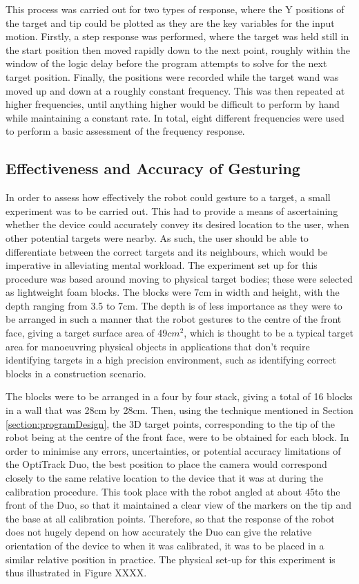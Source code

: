 \documentclass[11pt]{article}
\begin{document}
This process was carried out for two types of response, where the Y positions of the target and tip could be plotted as they are the key variables for the input motion. Firstly, a step response was performed, where the target was held still in the start position then moved rapidly down to the next point, roughly within the window of the logic delay before the program attempts to solve for the next target position. Finally, the positions were recorded while the target wand was moved up and down at a roughly constant frequency. This was then repeated at higher frequencies, until anything higher would be difficult to perform by hand while maintaining a constant rate. In total, eight different frequencies were used to perform a basic assessment of the frequency response.


\subsection{Effectiveness and Accuracy of Gesturing}

In order to assess how effectively the robot could gesture to a target, a small experiment was to be carried out. This had to provide a means of ascertaining whether the device could accurately convey its desired location to the user, when other potential targets were nearby. As such, the user should be able to differentiate between the correct targets and its neighbours, which would be imperative in alleviating mental workload. The experiment set up for this procedure was based around moving to physical target bodies; these were selected as lightweight foam blocks. The blocks were 7cm in width and height, with the depth ranging from 3.5 to 7cm. The depth is of less importance as they were to be arranged in such a manner that the robot gestures to the centre of the front face, giving a target surface area of 49$cm^{2}$, which is thought to be a typical target area for manoeuvring physical objects in applications that don't require identifying targets in a high precision environment, such as identifying correct blocks in a construction scenario.

The blocks were to be arranged in a four by four stack, giving a total of 16 blocks in a wall that was 28cm by 28cm. Then, using the technique mentioned in Section \ref{section:programDesign}, the 3D target points, corresponding to the tip of the robot being at the centre of the front face, were to be obtained for each block. In order to minimise any errors, uncertainties, or potential accuracy limitations of the OptiTrack Duo, the best position to place the camera would correspond closely to the same relative location to the device that it was at during the calibration procedure. This took place with the robot angled at about 45\degree to the front of the Duo, so that it maintained a clear view of the markers on the tip and the base at all calibration points. Therefore, so that the response of the robot does not hugely depend on how accurately the Duo can give the relative orientation of the device to when it was calibrated, it was to be placed in a similar relative position in practice. The physical set-up for this experiment is thus illustrated in Figure XXXX.
\end{document}
